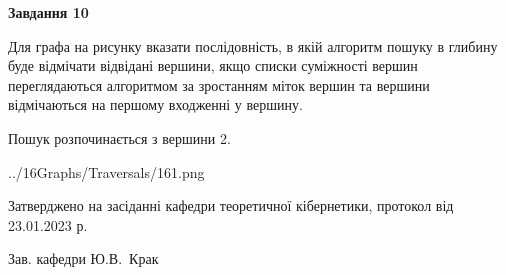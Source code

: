 \documentclass[12pt, ukrainian]{article}
\begin{document}
{\begin {large}
{\begin {center}\textbf{Завдання 10}\end {center}}\par
Для графа на рисунку вказати послідовність, в якій алгоритм пошуку в глибину буде відмічати відвідані вершини, якщо списки суміжності вершин переглядаються алгоритмом за зростанням міток вершин та вершини відмічаються на першому вход\-женні у вершину.\par
Пошук розпочинається з вершини 2.\par

\begin{center}
	{../16Graphs/Traversals/161.png}
\end{center}\par
\newpage


\end {large}
}
{\smallskip \begin {small} Затверджено на засіданні кафедри теоретичної кібернетики, протокол  від   23.01.2023 р.\par\smallskip\smallskip
{\parbox {6.5 cm}{Зав. кафедри \dotfill Ю.В.~Крак}} \end{small}}
\end{document}
